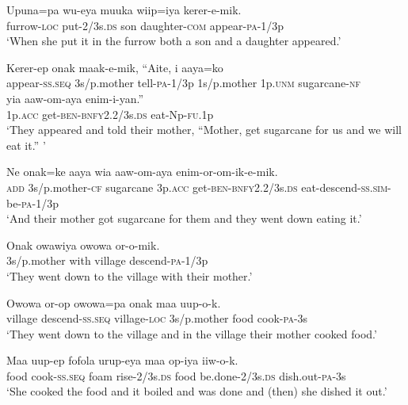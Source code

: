 \ea\label{ex:a:x2}
\gll  Upuna=pa  wu-eya  muuka  wiip=iya  kerer-e-mik. \\
furrow-\textsc{loc}  put-2/3s.\textsc{ds}  son  daughter-\textsc{com}  appear-\textsc{pa}-1/3p \\
\glt ‘When she put it in the furrow both a son and a daughter appeared.’ \\
\z


\ea\label{ex:a:x3}
\gll  Kerer-ep  onak  maak-e-mik,  “Aite,  i  aaya=ko \\
appear-\textsc{ss.seq}  3s/p.mother  tell-\textsc{pa}-1/3p  1s/p.mother  1p.\textsc{unm}  sugarcane-\textsc{nf} \\
yia  aaw-om-aya  enim-i-yan.” \\
1p.\textsc{acc}  get-\textsc{ben}-\textsc{bnfy}2.2/3s.\textsc{ds}  eat-Np-\textsc{fu}.1p \\
\glt ‘They appeared and told their mother, “Mother, get sugarcane for us and we will eat it.” ’ \\
\z


\ea\label{ex:a:x4}
\gll  Ne  onak=ke  aaya  wia  aaw-om-aya                       enim-or-om-ik-e-mik. \\
\textsc{add}  3s/p.mother-\textsc{cf}  sugarcane  3p.\textsc{acc}  get-\textsc{ben}-\textsc{bnfy}2.2/3s.\textsc{ds}  eat-descend-\textsc{ss}.\textsc{sim}-be-\textsc{pa}-1/3p \\


\glt ‘And their mother got sugarcane for them and they went down eating it.’ \\
\z


\ea\label{ex:a:x5}
\gll  Onak  owawiya  owowa  or-o-mik. \\
3s/p.mother  with  village  descend-\textsc{pa}-1/3p \\
\glt ‘They went down to the village with their mother.’ \\
\z


\ea\label{ex:a:x6}
\gll  Owowa  or-op  owowa=pa  onak  maa  uup-o-k. \\
village  descend-\textsc{ss.seq}  village-\textsc{loc}  3s/p.mother  food  cook-\textsc{pa}-3s \\
\glt ‘They went down to the village and in the village their mother cooked food.’ \\
\z


\ea\label{ex:a:x7}
\gll  Maa  uup-ep  fofola  urup-eya  maa  op-iya  iiw-o-k. \\
food  cook-\textsc{ss.seq}  foam  rise-2/3s.\textsc{ds}  food  be.done-2/3s.\textsc{ds}  dish.out-\textsc{pa}-3s \\
\glt ‘She cooked the food and it boiled and was done and (then) she dished it out.’ \\
\z


